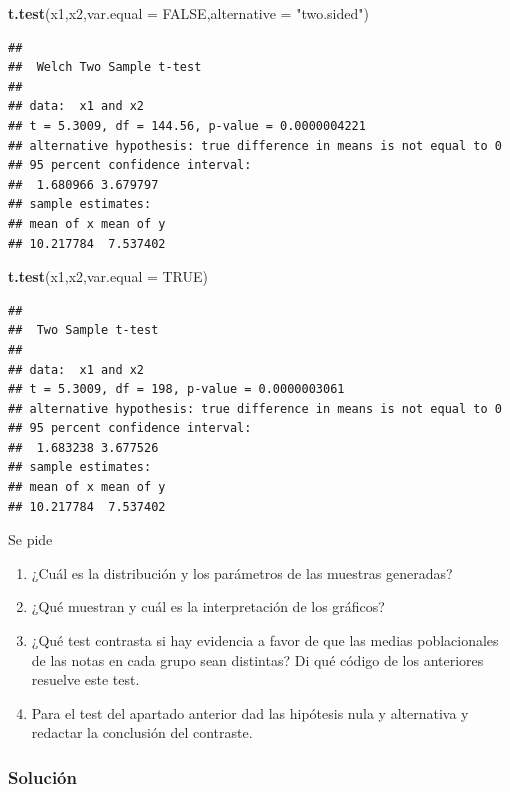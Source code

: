 \documentclass[
]{article}
\newenvironment{Shaded}{\begin{snugshade}}{\end{snugshade}}
\newcommand{\DataTypeTok}[1]{\textcolor[rgb]{0.13,0.29,0.53}{#1}}
\newcommand{\KeywordTok}[1]{\textcolor[rgb]{0.13,0.29,0.53}{\textbf{#1}}}
\newcommand{\NormalTok}[1]{#1}
\newcommand{\OtherTok}[1]{\textcolor[rgb]{0.56,0.35,0.01}{#1}}
\newcommand{\StringTok}[1]{\textcolor[rgb]{0.31,0.60,0.02}{#1}}
\providecommand{\tightlist}{%
  \setlength{\itemsep}{0pt}\setlength{\parskip}{0pt}}
\begin{document}
\begin{Shaded}
\begin{Highlighting}[]
\KeywordTok{t.test}\NormalTok{(x1,x2,}\DataTypeTok{var.equal =} \OtherTok{FALSE}\NormalTok{,}\DataTypeTok{alternative =} \StringTok{"two.sided"}\NormalTok{)}
\end{Highlighting}
\end{Shaded}

\begin{verbatim}
## 
##  Welch Two Sample t-test
## 
## data:  x1 and x2
## t = 5.3009, df = 144.56, p-value = 0.0000004221
## alternative hypothesis: true difference in means is not equal to 0
## 95 percent confidence interval:
##  1.680966 3.679797
## sample estimates:
## mean of x mean of y 
## 10.217784  7.537402
\end{verbatim}

\begin{Shaded}
\begin{Highlighting}[]
\KeywordTok{t.test}\NormalTok{(x1,x2,}\DataTypeTok{var.equal =} \OtherTok{TRUE}\NormalTok{)}
\end{Highlighting}
\end{Shaded}

\begin{verbatim}
## 
##  Two Sample t-test
## 
## data:  x1 and x2
## t = 5.3009, df = 198, p-value = 0.0000003061
## alternative hypothesis: true difference in means is not equal to 0
## 95 percent confidence interval:
##  1.683238 3.677526
## sample estimates:
## mean of x mean of y 
## 10.217784  7.537402
\end{verbatim}

Se pide

\begin{enumerate}
\def\labelenumi{\arabic{enumi}.}
\tightlist
\item
  ¿Cuál es la distribución y los parámetros de las muestras generadas?
\item
  ¿Qué muestran y cuál es la interpretación de los gráficos?
\item
  ¿Qué test contrasta si hay evidencia a favor de que las medias
  poblacionales de las notas en cada grupo sean distintas? Di qué código
  de los anteriores resuelve este test.
\item
  Para el test del apartado anterior dad las hipótesis nula y
  alternativa y redactar la conclusión del contraste.
\end{enumerate}

\hypertarget{soluciuxf3n-1}{%
\subsubsection{Solución}\label{soluciuxf3n-1}}
\end{document}
